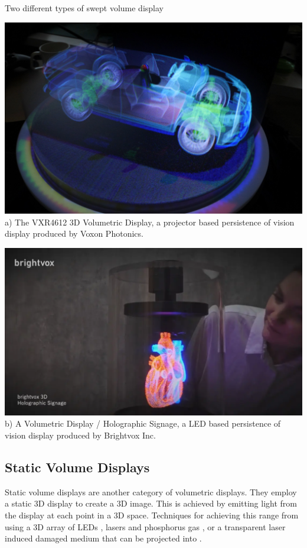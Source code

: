 \begin{figureBox}[label={fig:swept-volume-displays}]{Two different types of swept volume display}
  \begin{minipage}[t]{0.48\textwidth}
    \includegraphics[width=\textwidth]{./background/figures/3d/voxon.jpg}
    \small {a) The VXR4612 3D Volumetric Display, a projector based persistence of vision display produced by Voxon Photonics. \tocite}
  \end{minipage}\hfill
  \begin{minipage}[t]{0.48\textwidth}
    \includegraphics[width=\textwidth]{./background/figures/3d/brightvox.png}
    \small {b) A Volumetric Display / Holographic Signage, a LED based persistence of vision display produced by Brightvox Inc. \tocite}
  \end{minipage}
\end{figureBox}

\subsection{Static Volume Displays}
Static volume displays are another category of volumetric displays. They employ a static 3D display to create a 3D image. This is achieved by emitting light from the display at each point in a 3D space. Techniques for achieving this range from using a 3D array of LEDs \cite{10.1145/2341931.2341937}, lasers and phosphorus gas \cite{https://doi.org/10.1002/anie.202003160}, or a transparent laser induced damaged medium that can be projected into \cite{10.1145/1179849.1179982}.

